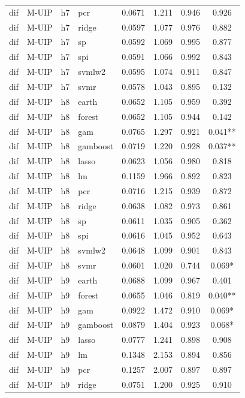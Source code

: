 \begin{ThreePartTable}
\begin{longtable}[t]{llclcccc}
dif & M-UIP & h7 & pcr & 0.0671 & 1.211 & 0.946 & 0.926\\
dif & M-UIP & h7 & ridge & 0.0597 & 1.077 & 0.976 & 0.882\\
dif & M-UIP & h7 & sp & 0.0592 & 1.069 & 0.995 & 0.877\\
dif & M-UIP & h7 & spi & 0.0591 & 1.066 & 0.992 & 0.843\\
dif & M-UIP & h7 & svmlw2 & 0.0595 & 1.074 & 0.911 & 0.847\\
dif & M-UIP & h7 & svmr & 0.0578 & 1.043 & 0.895 & 0.132\\
\addlinespace
dif & M-UIP & h8 & earth & 0.0652 & 1.105 & 0.959 & 0.392\\
dif & M-UIP & h8 & forest & 0.0652 & 1.105 & 0.944 & 0.142\\
dif & M-UIP & h8 & gam & 0.0765 & 1.297 & 0.921 & 0.041**\\
dif & M-UIP & h8 & gamboost & 0.0719 & 1.220 & 0.928 & 0.037**\\
dif & M-UIP & h8 & lasso & 0.0623 & 1.056 & 0.980 & 0.818\\
dif & M-UIP & h8 & lm & 0.1159 & 1.966 & 0.892 & 0.823\\
dif & M-UIP & h8 & pcr & 0.0716 & 1.215 & 0.939 & 0.872\\
dif & M-UIP & h8 & ridge & 0.0638 & 1.082 & 0.973 & 0.861\\
dif & M-UIP & h8 & sp & 0.0611 & 1.035 & 0.905 & 0.362\\
dif & M-UIP & h8 & spi & 0.0616 & 1.045 & 0.952 & 0.643\\
dif & M-UIP & h8 & svmlw2 & 0.0648 & 1.099 & 0.901 & 0.843\\
dif & M-UIP & h8 & svmr & 0.0601 & 1.020 & 0.744 & 0.069*\\
\addlinespace
dif & M-UIP & h9 & earth & 0.0688 & 1.099 & 0.967 & 0.401\\
dif & M-UIP & h9 & forest & 0.0655 & 1.046 & 0.819 & 0.040**\\
dif & M-UIP & h9 & gam & 0.0922 & 1.472 & 0.910 & 0.069*\\
dif & M-UIP & h9 & gamboost & 0.0879 & 1.404 & 0.923 & 0.068*\\
dif & M-UIP & h9 & lasso & 0.0777 & 1.241 & 0.898 & 0.908\\
dif & M-UIP & h9 & lm & 0.1348 & 2.153 & 0.894 & 0.856\\
dif & M-UIP & h9 & pcr & 0.1257 & 2.007 & 0.897 & 0.897\\
dif & M-UIP & h9 & ridge & 0.0751 & 1.200 & 0.925 & 0.910\\

\end{longtable}
\end{ThreePartTable}
